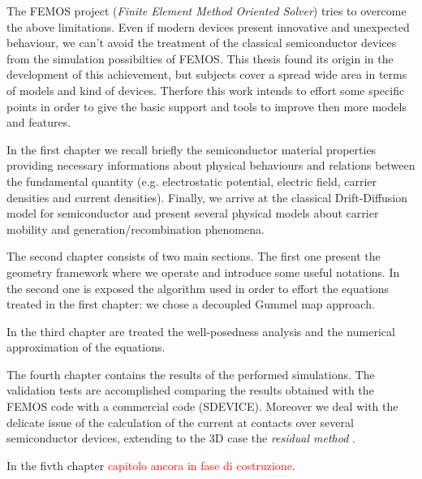 The FEMOS project (\textit{Finite Element Method Oriented Solver}) tries to overcome the above limitations. 
Even if modern devices present innovative and unexpected behaviour, we can't avoid the treatment of the classical semiconductor devices from the simulation possibilties of FEMOS.
This thesis found its origin in the development of this achievement, but subjects cover a spread wide area in terms of models and kind of devices. Therfore this work intends to effort some specific points in order to give the basic support and tools to improve then more models and features. 

In the first chapter we recall briefly the semiconductor material properties providing necessary informations about physical behaviours and relations between the fundamental quantity (e.g. electrostatic potential, electric field, carrier densities and current densities). Finally, we arrive at the classical Drift-Diffusion model for semiconductor and present several physical models about carrier mobility and generation/recombination phenomena.

The second chapter consists of two main sections. The first one present the geometry framework where we operate and introduce some useful notations. In the second one is exposed the algorithm used in order to effort the equations treated in the first chapter: we chose a decoupled Gummel map approach.

In the third chapter  are treated the well-posedness analysis and the numerical approximation of the equations.

The fourth chapter contains the results of the performed simulations. The validation tests are accomplished comparing the results obtained with the FEMOS code with a commercial code (SDEVICE). Moreover we deal with the delicate issue of the calculation of the current at contacts over several semiconductor devices, extending to the 3D case the \textit{residual method} \cite{ContactCurrentRM}.

In the fivth chapter \textcolor{red}{capitolo ancora in fase di costruzione}.

